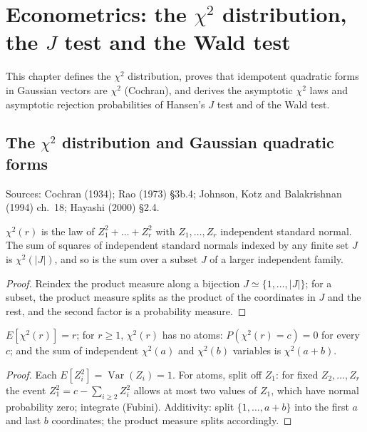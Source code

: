 \chapter{Econometrics: the \texorpdfstring{$\chi^2$}{chi-squared} distribution, the \texorpdfstring{$J$}{J} test and the Wald test}
\label{chap:econometrics8}

This chapter defines the $\chi^2$ distribution, proves that idempotent quadratic forms in Gaussian vectors are
$\chi^2$ (Cochran), and derives the asymptotic $\chi^2$ laws and asymptotic rejection probabilities of Hansen's $J$
test and of the Wald test.

\section{The \texorpdfstring{$\chi^2$}{chi-squared} distribution and Gaussian quadratic forms}
\label{sec:chi-squared}

Sources: Cochran (1934); Rao (1973) \S3b.4; Johnson, Kotz and Balakrishnan (1994) ch.~18; Hayashi (2000) \S2.4.

\begin{definition}
\label{def:chi-squared}
\leanok
$\chi^2(r)$ is the law of $Z_1^2+\dots+Z_r^2$ with $Z_1,\dots,Z_r$ independent standard normal. The sum of squares of
independent standard normals indexed by any finite set $J$ is $\chi^2(|J|)$, and so is the sum over a subset $J$ of a
larger independent family.
\end{definition}
\begin{proof}
\leanok
Reindex the product measure along a bijection $J\simeq\{1,\dots,|J|\}$; for a subset, the product measure splits as
the product of the coordinates in $J$ and the rest, and the second factor is a probability measure.
\end{proof}

\begin{lemma}
\label{lem:chi-squared-props}
\leanok
{}
$E[\chi^2(r)] = r$; for $r\ge1$, $\chi^2(r)$ has no atoms: $P(\chi^2(r) = c) = 0$ for every $c$; and the sum of
independent $\chi^2(a)$ and $\chi^2(b)$ variables is $\chi^2(a+b)$.
\end{lemma}
\begin{proof}
\leanok
Each $E[Z_i^2] = \operatorname{Var}(Z_i) = 1$. For atoms, split off $Z_1$: for fixed $Z_2,\dots,Z_r$ the event
$Z_1^2 = c - \sum_{i\ge2}Z_i^2$ allows at most two values of $Z_1$, which have normal probability zero; integrate
(Fubini). Additivity: split $\{1,\dots,a+b\}$ into the first $a$ and last $b$ coordinates; the product measure
splits accordingly.
\end{proof}


